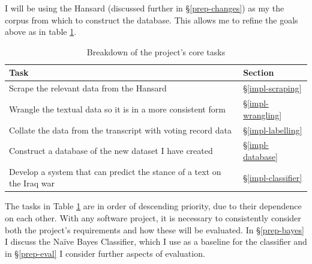 \documentclass[12pt,a4paper,twoside,openright]{report}
\begin{document}
I will be using the Hansard \cite{hansard} (discussed further in \S\ref{prep-changes}) as my the corpus from which to construct the database. This allows me to refine the goals above as in table \ref{table:tasks}.
\begin{table}[]
	\label{table:tasks}
	\centering
	\begin{tabular}{@{}ll@{}}
		\toprule
		\textbf{Task}                                                          & \textbf{Section}          \\ \midrule
		Scrape the relevant data from the Hansard                              & \S\ref{impl-scraping}   \\
		Wrangle the textual data so it is in a more consistent form          & \S\ref{impl-wrangling}  \\
	    Collate the data from the transcript with voting record data           & \S\ref{impl-labelling}  \\
	    Construct a database of the new dataset I have created            	   & \S\ref{impl-database}   \\
		Develop a system that can predict the stance of a text on the Iraq war & \S\ref{impl-classifier} \\ \bottomrule
	\end{tabular}
	\caption{Breakdown of the project's core tasks}
\end{table}

The tasks in Table \ref{table:tasks} are in order of descending priority, due to their dependence on each other.
\newline
\newline
With any software project, it is necessary to consistently consider both the project's requirements and how these will be evaluated. In \S\ref{prep-bayes} I discuss the Na\"{i}ve Bayes Classifier, which I use as a baseline for the classifier and in \S\ref{prep-eval} I consider further aspects of evaluation.
\end{document}
